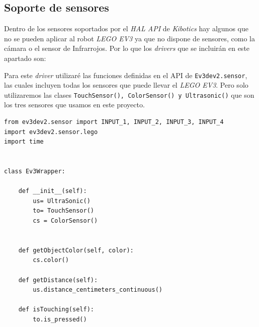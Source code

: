 \subsection{Soporte de sensores}
Dentro de los sensores soportados por el \textit{HAL API} de \textit{Kibotics} hay algunos que no se pueden aplicar al robot \textit{LEGO EV3} ya que no dispone de sensores, como la cámara o el sensor de Infrarrojos. Por lo que los \textit{drivers} que se incluirán en este apartado son:

\begin{table}[H]
\caption{Métodos (HAL API) soportados por Ev3.}
\vspace{0.5cm}
\label{tab:tablaSensores}
\end{table}

Para este \textit{driver} utilizaré las funciones definidas en el API de \texttt{Ev3dev2.sensor}, las cuales incluyen todas los sensores que puede llevar el \textit{LEGO EV3}. Pero solo utilizaremos las clases \texttt{TouchSensor(), ColorSensor() y Ultrasonic()} que son los tres sensores que usamos en este proyecto. 

\begin{lstlisting}[frame=single,breaklines=true, label=Driver Actuadores, caption=Drivers,  captionpos=b]
from ev3dev2.sensor import INPUT_1, INPUT_2, INPUT_3, INPUT_4
import ev3dev2.sensor.lego
import time


class Ev3Wrapper:

    def __init__(self):
        us= UltraSonic()
        to= TouchSensor()
        cs = ColorSensor()


    def getObjectColor(self, color):
        cs.color()

    def getDistance(self):
        us.distance_centimeters_continuous()

    def isTouching(self):
        to.is_pressed()
\end{lstlisting}

